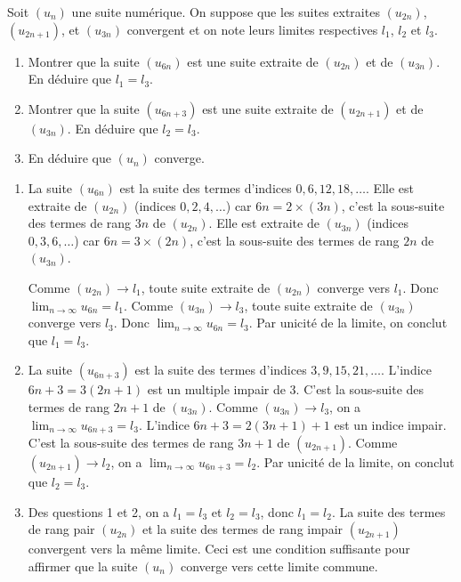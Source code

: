 \documentclass[solutions]{exercices}
\begin{document}
\begin{exercice}
	Soit $(u_{n})$ une suite numérique. On suppose que les suites extraites $(u_{2n})$, $(u_{2n + 1})$, et $(u_{3n})$ convergent et on note leurs limites respectives $l_1$, $l_2$ et $l_3$.
	\begin{enumerate}
		\item Montrer que la suite $(u_{6n})$ est une suite extraite de $(u_{2n})$ et de $(u_{3n})$. En déduire que $l_1=l_3$.
		\item Montrer que la suite $(u_{6n+3})$ est une suite extraite de $(u_{2n+1})$ et de $(u_{3n})$. En déduire que $l_2=l_3$.
		\item En déduire que $(u_n)$ converge.
	\end{enumerate}
\end{exercice}

\begin{solution}
	\begin{enumerate}
		\item La suite $(u_{6n})$ est la suite des termes d'indices $0, 6, 12, 18, \dots$.
		      Elle est extraite de $(u_{2n})$ (indices $0,2,4,\dots$) car $6n = 2 \times (3n)$, c'est la sous-suite des termes de rang $3n$ de $(u_{2n})$.
		      Elle est extraite de $(u_{3n})$ (indices $0,3,6,\dots$) car $6n = 3 \times (2n)$, c'est la sous-suite des termes de rang $2n$ de $(u_{3n})$.

		      Comme $(u_{2n}) \to l_1$, toute suite extraite de $(u_{2n})$ converge vers $l_1$. Donc $\lim_{n\to\infty} u_{6n} = l_1$.
		      Comme $(u_{3n}) \to l_3$, toute suite extraite de $(u_{3n})$ converge vers $l_3$. Donc $\lim_{n\to\infty} u_{6n} = l_3$.
		      Par unicité de la limite, on conclut que $l_1=l_3$.
		\item La suite $(u_{6n+3})$ est la suite des termes d'indices $3, 9, 15, 21, \dots$.
		      L'indice $6n+3 = 3(2n+1)$ est un multiple impair de 3. C'est la sous-suite des termes de rang $2n+1$ de $(u_{3n})$. Comme $(u_{3n}) \to l_3$, on a $\lim_{n\to\infty} u_{6n+3} = l_3$.
		      L'indice $6n+3 = 2(3n+1)+1$ est un indice impair. C'est la sous-suite des termes de rang $3n+1$ de $(u_{2n+1})$. Comme $(u_{2n+1}) \to l_2$, on a $\lim_{n\to\infty} u_{6n+3} = l_2$.
		      Par unicité de la limite, on conclut que $l_2=l_3$.
		\item Des questions 1 et 2, on a $l_1 = l_3$ et $l_2 = l_3$, donc $l_1 = l_2$.
		      La suite des termes de rang pair $(u_{2n})$ et la suite des termes de rang impair $(u_{2n+1})$ convergent vers la même limite.
		      Ceci est une condition suffisante pour affirmer que la suite $(u_n)$ converge vers cette limite commune.
	\end{enumerate}
\end{solution}
\end{document}
